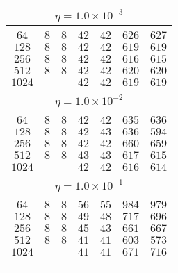 \begin{center}
\begin{table}[]
\begin{center}
\begin{tabular}{@{}c||cc|cc|cc@{}}
\multicolumn{7}{c}{$\eta = 1.0\times 10^{-3}$} \\[5pt]
\hline\\[-11pt]
$64$ & $8$  & $8$ & $42$  & $42$ & $626$  & $627$ \\ [1pt]
$128$ & $8$ & $8$ & $42$  & $42$ & $619$  & $619$ \\ [1pt]
$256$ & $8$ & $8$ & $42$  & $42$ & $616$  & $615$ \\ [1pt]
$512$ & $8$ & $8$ & $42$  & $42$ & $620$  & $620$ \\ [1pt]
$1024$      &&    & $42$  & $42$ & $619$  & $619$ \\ [1pt]
\hline\\[-11pt]

\multicolumn{7}{c}{$\eta = 1.0\times 10^{-2}$} \\[5pt]
\hline\\[-11pt]
$64$ & $8$  & $8$ & $42$  & $42$ & $635$  & $636$ \\ [1pt]
$128$ & $8$ & $8$ & $42$  & $43$ & $636$  & $594$ \\ [1pt]
$256$ & $8$ & $8$ & $42$  & $42$ & $660$  & $659$ \\ [1pt]
$512$ & $8$ & $8$ & $43$  & $43$ & $617$  & $615$ \\ [1pt]
$1024$      &&    & $42$  & $42$ & $616$  & $614$ \\ [1pt]
\hline\\[-11pt]

\multicolumn{7}{c}{$\eta = 1.0\times 10^{-1}$} \\[5pt]
\hline\\[-11pt]
$64$  & $8$ & $8$ & $56$   & $55$ & $984$  & $979 $\\ [1pt]
$128$ & $8$ & $8$ & $49$   & $48$ & $717$  & $696 $\\ [1pt]
$256$ & $8$ & $8$ & $45$   & $43$ & $661$  & $667 $\\ [1pt]
$512$ & $8$ & $8$ & $41$   & $41$ & $603$  & $573 $\\ [1pt]
$1024$      &&    & $41$   & $41$ & $671$  & $716 $\\ [1pt]
\hline\\[-11pt]

\hline\\[-8pt]
\end{tabular}\\[5pt]
\end{center}
\normalsize
\end{table}
\end{center}
\vspace*{\fill}